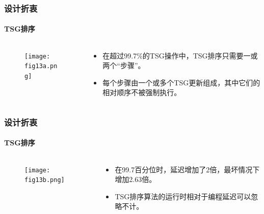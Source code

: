\begin{frame}
    \frametitle{设计折衷}
    \framesubtitle{TSG排序}
    \begin{columns}
        \begin{column}{0.4\textwidth}
            \begin{figure}
                \texttt{[image: fig13a.png]}
            \end{figure}
        \end{column}
        \begin{column}{0.6\textwidth}
            \begin{itemize}
                \item 在超过99.7\%的TSG操作中，TSG排序只需要一或两个“步骤”。
                \item 每个步骤由一个或多个TSG更新组成，其中它们的相对顺序不被强制执行。
            \end{itemize}
        \end{column}
    \end{columns}
\end{frame}

\begin{frame}
    \frametitle{设计折衷}
    \framesubtitle{TSG排序}
    \begin{columns}
        \begin{column}{0.4\textwidth}
            \begin{figure}
                \texttt{[image: fig13b.png]}
            \end{figure}
        \end{column}
        \begin{column}{0.6\textwidth}
            \begin{itemize}
                \item 在99.7百分位时，延迟增加了2倍，最坏情况下增加2.63倍。
                \item TSG排序算法的运行时相对于编程延迟可以忽略不计。
            \end{itemize}
        \end{column}
    \end{columns}
\end{frame}

